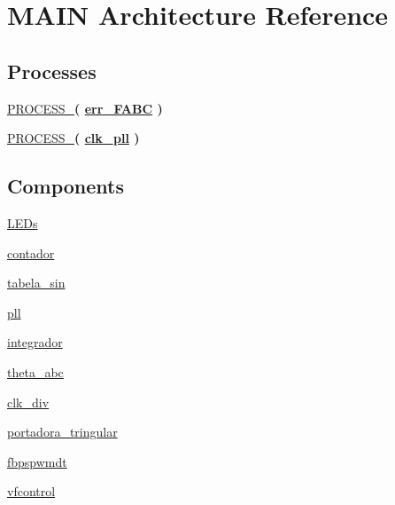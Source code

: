 \hypertarget{class_d_e0___n_a_n_o___v_f_1_1_m_a_i_n}{}\section{M\+A\+I\+N Architecture Reference}
\label{class_d_e0___n_a_n_o___v_f_1_1_m_a_i_n}
\subsection*{Processes}
 \begin{DoxyCompactItemize}
\item 
\hyperlink{class_d_e0___n_a_n_o___v_f_1_1_m_a_i_n_aa22d55790db1f4e085c8fc295cb0e58f}{P\+R\+O\+C\+E\+S\+S\+\_}{\bfseries  ( {\bfseries {\bfseries \hyperlink{class_d_e0___n_a_n_o___v_f_1_1_m_a_i_n_ac14ffa45ea42ce220a8e8316677fe263}{err\+\_\+\+F\+A\+B\+C}} \textcolor{vhdlchar}{ }} )}
\item 
\hyperlink{class_d_e0___n_a_n_o___v_f_1_1_m_a_i_n_a3c39b25652f7e5cb193fa2fd950d6b5e}{P\+R\+O\+C\+E\+S\+S\+\_}{\bfseries  ( {\bfseries {\bfseries \hyperlink{class_d_e0___n_a_n_o___v_f_1_1_m_a_i_n_a1d63ebfc050c1099e1dff991817ec3b0}{clk\+\_\+pll}} \textcolor{vhdlchar}{ }} )}
\end{DoxyCompactItemize}
\subsection*{Components}
 \begin{DoxyCompactItemize}
\item 
\hyperlink{class_d_e0___n_a_n_o___v_f_1_1_m_a_i_n_ab6831a7d06c0a2bc69f9b024f6445a80}{L\+E\+Ds}  {\bfseries }  
\item 
\hyperlink{class_d_e0___n_a_n_o___v_f_1_1_m_a_i_n_a1ccf3e82106c07c2170611228e638a34}{contador}  {\bfseries }  
\item 
\hyperlink{class_d_e0___n_a_n_o___v_f_1_1_m_a_i_n_a4b5d0694f1c75396055f15cd7542add4}{tabela\+\_\+sin}  {\bfseries }  
\item 
\hyperlink{class_d_e0___n_a_n_o___v_f_1_1_m_a_i_n_af3891c65cf7793203a9df0cf918d0235}{pll}  {\bfseries }  
\item 
\hyperlink{class_d_e0___n_a_n_o___v_f_1_1_m_a_i_n_a8127d44aee38572cef223d0c27d447ab}{integrador}  {\bfseries }  
\item 
\hyperlink{class_d_e0___n_a_n_o___v_f_1_1_m_a_i_n_a15ab86106af3275297d1b9099a75ea1e}{theta\+\_\+abc}  {\bfseries }  
\item 
\hyperlink{class_d_e0___n_a_n_o___v_f_1_1_m_a_i_n_a39b27375c53f9cfc5759f4a53877ba0b}{clk\+\_\+div}  {\bfseries }  
\item 
\hyperlink{class_d_e0___n_a_n_o___v_f_1_1_m_a_i_n_a954f74a648a4905eff27c767a774c6dd}{portadora\+\_\+tringular}  {\bfseries }  
\item 
\hyperlink{class_d_e0___n_a_n_o___v_f_1_1_m_a_i_n_a4c526d0b606c178a7dddccfa2ae34ba6}{fbpspwmdt}  {\bfseries }  
\item 
\hyperlink{class_d_e0___n_a_n_o___v_f_1_1_m_a_i_n_a96f8f02a115cd76909b2395df08d3902}{vfcontrol}  {\bfseries }  
\end{DoxyCompactItemize}
